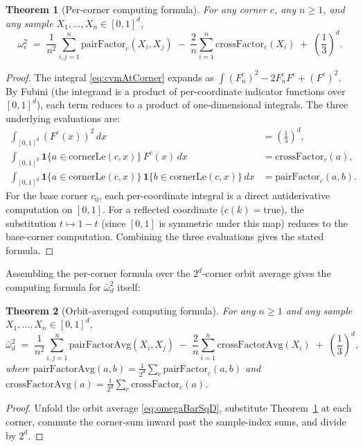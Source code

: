 \documentclass[pdflatex]{sn-jnl}
\theoremstyle{thmstyleone}
\newtheorem{theorem}{Theorem}[section]
\theoremstyle{thmstyletwo}
\theoremstyle{thmstylethree}
\begin{document}
\begin{theorem}[Per-corner computing formula]\label{thm:computing}
For any corner $c$, any $n\ge 1$, and any sample $X_1,\dots,X_n\in[0,1]^d$,
\[
  \omega^2_c \;=\; \frac{1}{n^2}\sum_{i,j=1}^n \mathrm{pairFactor}_c(X_i,X_j) \;-\; \frac{2}{n}\sum_{i=1}^n \mathrm{crossFactor}_c(X_i) \;+\; \left(\frac{1}{3}\right)^d.
\]
\end{theorem}

\begin{proof}
The integral \eqref{eq:cvmAtCorner} expands as $\int(F_n^c)^2 - 2F_n^c F^c + (F^c)^2$. By Fubini (the integrand is a product of per-coordinate indicator functions over $[0,1]^d$), each term reduces to a product of one-dimensional integrals. The three underlying evaluations are:
\begin{align}
  \int_{[0,1]^d} (F^c(x))^2\,dx &= \left(\frac{1}{3}\right)^d, \label{eq:int-sq}\\
  \int_{[0,1]^d} \mathbf{1}\{a\in\mathrm{cornerLe}(c,x)\}\,F^c(x)\,dx &= \mathrm{crossFactor}_c(a), \label{eq:int-ind-F}\\
  \int_{[0,1]^d} \mathbf{1}\{a\in\mathrm{cornerLe}(c,x)\}\,\mathbf{1}\{b\in\mathrm{cornerLe}(c,x)\}\,dx &= \mathrm{pairFactor}_c(a,b). \label{eq:int-ind-ind}
\end{align}
For the base corner $c_0$, each per-coordinate integral is a direct antiderivative computation on $[0,1]$. For a reflected coordinate ($c(k)=\mathrm{true}$), the substitution $t\mapsto 1-t$ (since $[0,1]$ is symmetric under this map) reduces to the base-corner computation. Combining the three evaluations gives the stated formula.
\end{proof}

Assembling the per-corner formula over the $2^d$-corner orbit average gives the computing formula for $\bar\omega^2_d$ itself:

\begin{theorem}[Orbit-averaged computing formula]\label{thm:omegaBar-computing}
For any $n\ge 1$ and any sample $X_1,\dots,X_n\in[0,1]^d$,
\[
  \bar\omega^2_d \;=\; \frac{1}{n^2}\sum_{i,j=1}^n \mathrm{pairFactorAvg}(X_i,X_j) \;-\; \frac{2}{n}\sum_{i=1}^n \mathrm{crossFactorAvg}(X_i) \;+\; \left(\frac{1}{3}\right)^d,
\]
where $\mathrm{pairFactorAvg}(a,b) = \frac{1}{2^d}\sum_c \mathrm{pairFactor}_c(a,b)$ and $\mathrm{crossFactorAvg}(a) = \frac{1}{2^d}\sum_c \mathrm{crossFactor}_c(a)$.
\end{theorem}

\begin{proof}
Unfold the orbit average \eqref{eq:omegaBarSqD}, substitute Theorem~\ref{thm:computing} at each corner, commute the corner-sum inward past the sample-index sums, and divide by $2^d$.
\end{proof}
\end{document}
